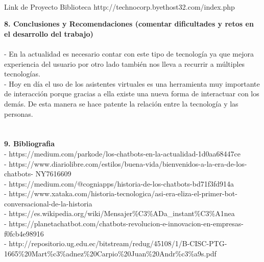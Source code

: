 \begin{flushleft}
\begin{itemize}
\textbf{ }\\
Link de Proyecto Biblioteca
http://technocorp.byethost32.com/index.php

\textbf{8.  Conclusiones y Recomendaciones (comentar dificultades y retos en el desarrollo del trabajo)}\\
\textbf{ }\\
-	En la actualidad es necesario contar con este tipo de tecnología ya que mejora  experiencia del usuario por otro lado también nos lleva a recurrir a múltiples tecnologías.\textbf{ }\\
-	Hoy en día el uso de los asistentes virtuales es una herramienta muy importante de interacción porque gracias a ella existe una nueva forma de interactuar con los demás. De esta manera se hace patente la relación entre la tecnología y las personas.\textbf{ }\\
\textbf{ }\\
\textbf{ }\\
\textbf{9. Bibliografia}\\

- https://medium.com/parkode/los-chatbots-en-la-actualidad-1d0aa68447ce\\
- https://www.diariolibre.com/estilos/buena-vida/bienvenidos-a-la-era-de-los-chatbots- NY7616609\\
- https://medium.com/@cogniapps/historia-de-los-chatbots-bd71f3fd914a\\
- https://www.xataka.com/historia-tecnologica/asi-era-eliza-el-primer-bot- conversacional-de-la-historia\\
- https://es.wikipedia.org/wiki/Mensajer\%C3\%ADa\_instant\%C3\%A1nea\\
- https://planetachatbot.com/chatbots-revolucion-e-innovacion-en-empresas- f0fcb4e98916\\
- http://repositorio.ug.edu.ec/bitstream/redug/45108/1/B-CISC-PTG-1665\%20Mart\%c3\%adnez\%20Carpio\%20Juan\%20Andr\%c3\%a9s.pdf\\


\end{itemize} 


\end{flushleft}